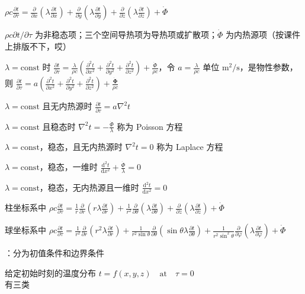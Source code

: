 $\rho c\frac{\partial t}{\partial\tau}=\frac{\partial}{\partial x}(\lambda\frac{\partial t}{\partial x})+\frac{\partial}{\partial y}(\lambda\frac{\partial t}{\partial y})+\frac{\partial}{\partial z}(\lambda\frac{\partial t}{\partial z})+\dot{\Phi}$

$\rho c\partial t/\partial\tau$ 为非稳态项；三个空间导热项为导热项或扩散项；$\dot{\Phi}$ 为内热源项（按课件上排版不下，哎）

$\lambda =\mathrm{const}$ 时 $\frac{\partial t}{\partial\tau}=\frac{\lambda}{\rho c}\left(\frac{\partial^2t}{\partial x^2}+\frac{\partial^2t}{\partial y^2}+\frac{\partial^2t}{\partial z^2}\right)+\frac{\dot{\Phi}}{\rho c}$，令 $a=\frac{\lambda}{\rho c}$ 单位 $\mathrm{m^2/s}$，是物性参数，则 $\frac{\partial t}{\partial\tau}=a\left(\frac{\partial^2t}{\partial x^2}+\frac{\partial^2t}{\partial y^2}+\frac{\partial^2t}{\partial z^2}\right)+\frac{\dot{\boldsymbol{\Phi}}}{\rho c}$

$\lambda=\mathrm{const}$ 且无内热源时 $\frac{\partial t}{\partial \tau}=a\nabla^2 t$

$\lambda = \mathrm{const}$ 且稳态时 $\nabla^2 t = -\frac{\dot{\Phi}}{\lambda}$ 称为 Poisson 方程

$\lambda = \mathrm{const}$，稳态，且无内热源时 $\nabla^2 t = 0$ 称为 Laplace 方程

$\lambda = \mathrm{const}$，稳态，一维时 $\frac{\mathrm{d}^2 t}{\mathrm{d}x^2}+\frac{\dot{\Phi}}{\lambda}=0$

$\lambda = \mathrm{const}$，稳态，无内热源且一维时 $\frac{\mathrm{d}^2 t}{\mathrm{d}x^2}=0$

柱坐标系中 $\rho c \frac{\partial t}{\partial \tau} =\frac{1}{r} \frac{\partial}{\partial r}\left(r \lambda \frac{\partial t}{\partial r}\right)+\frac{1}{r^2} \frac{\partial}{\partial \theta}\left(\lambda \frac{\partial t}{\partial \theta}\right)+\frac{\partial}{\partial z}\left(\lambda \frac{\partial t}{\partial z}\right)+\dot{\Phi}$

球坐标系中 $\rho c \frac{\partial t}{\partial \tau}=\frac{1}{r^2} \frac{\partial}{\partial r}\left(r^2 \lambda \frac{\partial t}{\partial r}\right)+\frac{1}{r^2 \sin \theta} \frac{\partial}{\partial \theta}\left(\sin \theta \lambda \frac{\partial t}{\partial \theta}\right)+\frac{1}{r^2 \sin^2 \theta} \frac{\partial}{\partial \varphi}\left(\lambda \frac{\partial t}{\partial \varphi}\right)+\dot{\Phi}$

：分为初值条件和边界条件

给定初始时刻的温度分布 $t = f(x,y,z) \quad \text{at} \quad \tau = 0$\\
有三类

